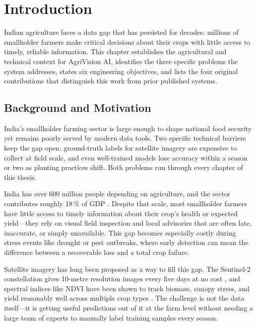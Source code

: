 \documentclass[12pt,a4paper,oneside]{report}
\begin{document}
\newpage
{}

\chapter{Introduction}

Indian agriculture faces a data gap that has persisted for decades: millions of smallholder farmers make critical decisions about their crops with little access to timely, reliable information. This chapter establishes the agricultural and technical context for AgriVision AI, identifies the three specific problems the system addresses, states six engineering objectives, and lists the four original contributions that distinguish this work from prior published systems.

\section{Background and Motivation}

India's smallholder farming sector is large enough to shape national food security yet remains poorly served by modern data tools. Two specific technical barriers keep the gap open: ground-truth labels for satellite imagery are expensive to collect at field scale, and even well-trained models lose accuracy within a season or two as planting practices shift. Both problems run through every chapter of this thesis.

India has over 600 million people depending on agriculture, and the sector
contributes roughly 18\,\% of GDP \cite{FAOSTAT2023}. Despite that scale, most
smallholder farmers have little access to timely information about their crop's
health or expected yield—they rely on visual field inspection and local advisories
that are often late, inaccurate, or simply unavailable. This gap becomes especially
costly during stress events like drought or pest outbreaks, where early detection
can mean the difference between a recoverable loss and a total crop failure.

Satellite imagery has long been proposed as a way to fill this gap. The Sentinel-2
constellation gives 10-metre resolution images every five days at no cost
\cite{drusch2012sentinel2}, and spectral indices like NDVI have been shown to
track biomass, canopy stress, and yield reasonably well across multiple crop types
\cite{tucker1979red, rouse1974monitoring}. The challenge is not the data itself—it
is getting useful predictions out of it at the farm level without needing a large
team of experts to manually label training samples every season.
\end{document}
